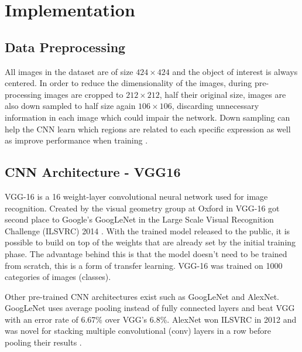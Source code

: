 \section{Implementation}


\subsection{Data Preprocessing}

All images in the dataset are of size $424\times424$ and the object of interest is always centered. In order to reduce the dimensionality of the images, during pre-processing images are cropped to $212\times212$, half their original size, images are also down sampled to half size again $ 106\times 106$, discarding unnecessary information in each image which could impair the network. Down sampling can help the CNN learn which regions are related to each specific expression as well as improve performance when training \cite{deep-learning-review}.

\subsection{CNN Architecture - VGG16}

\newcommand{\anet}{AlexNet\xspace}
\newcommand{\gnet}{GoogLeNet\xspace}
\newcommand{\inet}{ImageNet\xspace}

VGG-16 is a 16 weight-layer convolutional neural network used for image recognition. Created by the visual geometry group at Oxford in \citeyear{vgg16-arxiv} VGG-16 got second place to Google's \gnet in the Large Scale Visual Recognition Challenge (ILSVRC) 2014 \cite{vgg16-arxiv}. With the trained model released to the public, it is possible to build on top of the weights that are already set by the initial training phase. The advantage behind this is that the model doesn't need to be trained from scratch, this is a form of transfer learning. VGG-16 was trained on 1000 categories of images (classes).

Other pre-trained CNN architectures exist such as \gnet and \anet. \gnet uses average pooling instead of fully connected layers \cite{googlenet-paper} and beat VGG with an error rate of 6.67\% over VGG's 6.8\%. \anet won ILSVRC in 2012 and was novel for stacking multiple convolutional (conv) layers in a row before pooling their results \cite{alexnet-paper}. %

